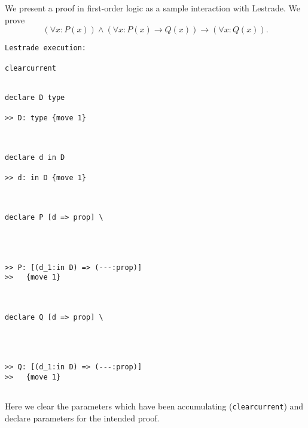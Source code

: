 \documentclass{slides}
\begin{document}
\begin{slide}

We present a proof in first-order logic as a sample interaction with Lestrade.  We prove $$(\forall x:P(x)) \wedge (\forall x:P(x) \rightarrow Q(x)) \rightarrow (\forall x:Q(x)).$$

\end{slide}

\begin{slide}

{\tiny

\begin{verbatim}Lestrade execution:

clearcurrent


declare D type

>> D: type {move 1}



declare d in D

>> d: in D {move 1}



declare P [d => prop] \
   



>> P: [(d_1:in D) => (---:prop)]
>>   {move 1}



declare Q [d => prop] \
   



>> Q: [(d_1:in D) => (---:prop)]
>>   {move 1}


\end{verbatim}
}
\end{slide}
Here we clear the parameters which have been accumulating ({\tt clearcurrent}) and declare parameters for the intended proof.
\end{document}
